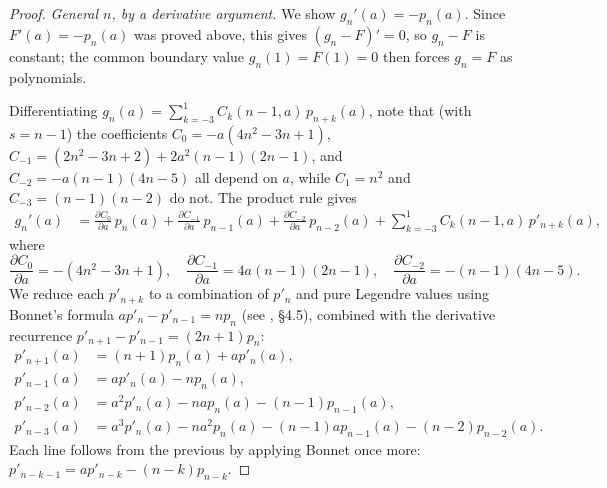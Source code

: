 \documentclass[11pt]{amsart}
\theoremstyle{definition}
\theoremstyle{remark}
\begin{document}
\begin{proof}
\textit{General $n$, by a derivative argument.}
We show $g_n'(a) = -p_n(a)$.
Since $F'(a) = -p_n(a)$ was proved above, this gives $(g_n-F)' = 0$,
so $g_n - F$ is constant; the common boundary value $g_n(1) = F(1) = 0$
then forces $g_n = F$ as polynomials.

Differentiating $g_n(a) = \sum_{k=-3}^{1} C_k(n-1,a)\,p_{n+k}(a)$,
note that (with $s = n-1$) the coefficients
$C_0 = -a(4n^2-3n+1)$,
$C_{-1} = (2n^2-3n+2)+2a^2(n-1)(2n-1)$,
and $C_{-2} = -a(n-1)(4n-5)$
all depend on $a$, while $C_1 = n^2$ and $C_{-3} = (n-1)(n-2)$ do not.
The product rule gives
\begin{align*}
  g_n'(a)
  &= \frac{\partial C_0}{\partial a}\,p_n(a)
   + \frac{\partial C_{-1}}{\partial a}\,p_{n-1}(a)
   + \frac{\partial C_{-2}}{\partial a}\,p_{n-2}(a)
   + \sum_{k=-3}^{1} C_k(n-1,a)\,p'_{n+k}(a),
\end{align*}
where
\[
  \frac{\partial C_0}{\partial a} = -(4n^2{-}3n{+}1),\quad
  \frac{\partial C_{-1}}{\partial a} = 4a(n{-}1)(2n{-}1),\quad
  \frac{\partial C_{-2}}{\partial a} = -(n{-}1)(4n{-}5).
\]
We reduce each $p'_{n+k}$ to a combination of $p'_n$ and pure
Legendre values using Bonnet's formula $ap'_n - p'_{n-1} = np_n$
(see \cite{Szego1939}, \S4.5), combined with the derivative
recurrence $p'_{n+1} - p'_{n-1} = (2n+1)p_n$:
\begin{align}
  p'_{n+1}(a) &= (n+1)p_n(a) + ap'_n(a), \label{eq:dpn1}\\
  p'_{n-1}(a) &= ap'_n(a) - np_n(a),     \label{eq:dpnm1}\\
  p'_{n-2}(a) &= a^2p'_n(a) - nap_n(a) - (n{-}1)p_{n-1}(a), \label{eq:dpnm2}\\
  p'_{n-3}(a) &= a^3p'_n(a) - na^2p_n(a)
                - (n{-}1)ap_{n-1}(a) - (n{-}2)p_{n-2}(a). \label{eq:dpnm3}
\end{align}
Each line follows from the previous by applying Bonnet once more:
$p'_{n-k-1} = ap'_{n-k} - (n-k)p_{n-k}$.


\end{proof}
\end{document}
